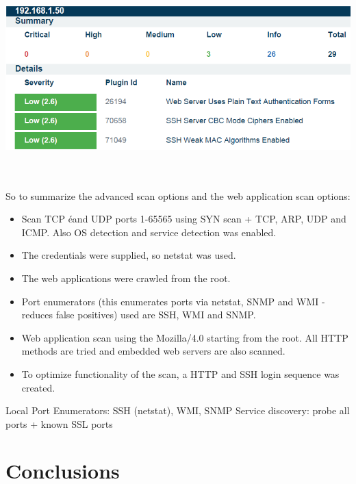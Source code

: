 \documentclass[11pt, a4paper]{article}
\begin{document}
$\;$ \\ \\
\noindent\begin{minipage}{\textwidth}
    \centering
    \includegraphics[width=\textwidth]{Nessus_12.png}
\end{minipage}
$\;$ \\ \\
So to summarize the advanced scan options and the web application scan options: 
\begin{itemize}
\item Scan TCP éand UDP ports 1-65565 using SYN scan + TCP, ARP, UDP and ICMP. Also OS detection and service detection was enabled.
\item The credentials were supplied, so netstat was used.
\item The web applications were crawled from the root.
\item Port enumerators (this enumerates ports via netstat, SNMP and WMI - reduces false positives) used are SSH, WMI and SNMP.
\item Web application scan using the Mozilla/4.0 starting from the root. All HTTP methods are tried and embedded web servers are also scanned.
\item To optimize functionality of the scan, a HTTP and SSH login sequence was created.
\end{itemize}

Local Port Enumerators: SSH (netstat), WMI, SNMP
Service discovery: probe all ports + known SSL ports

\section*{Conclusions}
\end{document}
